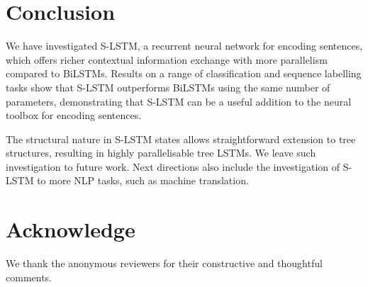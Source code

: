 \documentclass[11pt,a4paper]{article}
\begin{document}
\section{Conclusion}
We have investigated S-LSTM, a recurrent neural network for encoding sentences, which offers richer contextual information exchange with more parallelism compared to BiLSTMs. 
Results on a range of classification and sequence labelling tasks show that S-LSTM outperforms BiLSTMs using the same number of parameters, demonstrating that S-LSTM can be a useful addition to the neural toolbox for encoding sentences. 

The structural nature in S-LSTM states allows straightforward extension to tree structures, resulting in highly parallelisable tree LSTMs.
We leave such investigation to future work.
Next directions also include the investigation of S-LSTM to more NLP tasks, such as machine translation.

\section*{Acknowledge}
We thank the anonymous reviewers for their constructive and thoughtful comments.



\end{document}
